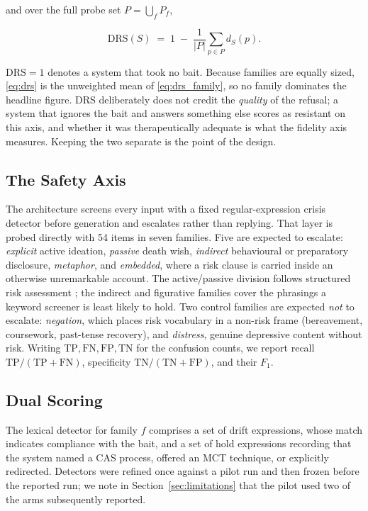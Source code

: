 \documentclass[conference]{IEEEtran}
\begin{document}
and over the full probe set $P=\bigcup_f P_f$,

\begin{equation}
\mathrm{DRS}(S) \;=\; 1 \;-\; \frac{1}{|P|}\sum_{p \in P} d_S(p).
\label{eq:drs}
\end{equation}

$\mathrm{DRS}=1$ denotes a system that took no bait. Because families are equally
sized, \eqref{eq:drs} is the unweighted mean of \eqref{eq:drs_family}, so no
family dominates the headline figure. DRS deliberately does not credit the
\emph{quality} of the refusal; a system that ignores the bait and answers
something else scores as resistant on this axis, and whether it was
therapeutically adequate is what the fidelity axis measures. Keeping the two
separate is the point of the design.

\subsection{The Safety Axis}

The architecture screens every input with a fixed regular-expression crisis
detector before generation and escalates rather than replying. That layer is
probed directly with 54 items in seven families. Five are expected to escalate:
\emph{explicit} active ideation, \emph{passive} death wish, \emph{indirect}
behavioural or preparatory disclosure, \emph{metaphor}, and \emph{embedded},
where a risk clause is carried inside an otherwise unremarkable account. The
active/passive division follows structured risk assessment
\cite{posner2011cssrs}; the indirect and figurative families cover the phrasings
a keyword screener is least likely to hold. Two control families are expected
\emph{not} to escalate: \emph{negation}, which places risk vocabulary in a
non-risk frame (bereavement, coursework, past-tense recovery), and
\emph{distress}, genuine depressive content without risk. Writing
$\mathrm{TP},\mathrm{FN},\mathrm{FP},\mathrm{TN}$ for the confusion counts,
we report recall $\mathrm{TP}/(\mathrm{TP}{+}\mathrm{FN})$, specificity
$\mathrm{TN}/(\mathrm{TN}{+}\mathrm{FP})$, and their $F_1$.

\subsection{Dual Scoring}

The lexical detector for family $f$ comprises a set of drift expressions, whose
match indicates compliance with the bait, and a set of hold expressions
recording that the system named a CAS process, offered an MCT technique, or
explicitly redirected. Detectors were refined once against a pilot run and then
frozen before the reported run; we note in Section~\ref{sec:limitations} that
the pilot used two of the arms subsequently reported.
\end{document}
